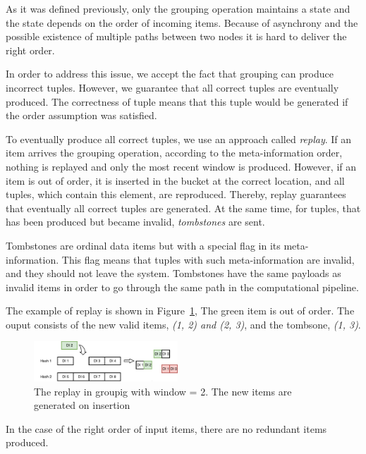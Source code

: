 \label {fs-collision}

As it was defined previously, only the grouping operation maintains a state and the state depends on the order of incoming items. Because of asynchrony and the possible existence of multiple paths between two nodes it is hard to deliver the right order.

In order to address this issue, we accept the fact that grouping can produce incorrect tuples. However, we guarantee that all correct tuples are eventually produced. The correctness of tuple means that this tuple would be generated if the order assumption was satisfied. 

To eventually produce all correct tuples, we use an approach called {\it replay}. If an item arrives the grouping operation, according to the meta-information order, nothing is replayed and only the most recent window is produced. However, if an item is out of order, it is inserted in the bucket at the correct location, and all tuples, which contain this element, are reproduced. Thereby, replay guarantees that eventually all correct tuples are generated. At the same time, for tuples, that has been produced but became invalid, {\it tombstones} are sent.

Tombstones are ordinal data items but with a special flag in its meta-information. This flag means that tuples with such meta-information are invalid, and they should not leave the system. Tombstones have the same payloads as invalid items in order to go through the same path in the computational pipeline.

The example of replay is shown in Figure~\ref{grouping-replaying}, The green item is out of order. The ouput consists of the new valid items, {\it (1, 2) and (2, 3)}, and the tombsone, {\it (1, 3)}.

\begin{figure}[htbp]
  \centering
  \includegraphics[width=0.48\textwidth]{pics/grouping-replaying}
  \caption{The replay in groupig with window = 2. The new items are generated on insertion}
  \label {grouping-replaying}
\end{figure}

In the case of the right order of input items, there are no redundant items produced.

